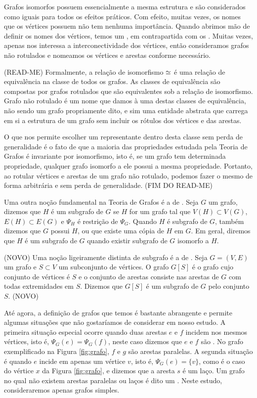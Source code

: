Grafos isomorfos possuem essencialmente a mesma estrutura e são considerados como iguais para todos os efeitos práticos. Com efeito, muitas vezes, os nomes que os vértices possuem não tem nenhuma importância. Quando abrimos mão de definir os nomes dos vértices, temos um , em contrapartida com os . Muitas vezes, apenas nos interessa a interconectividade dos vértices, então consideramos grafos não rotulados e nomeamos os vértices e arestas conforme necessário.

(READ-ME)
Formalmente, a relação de isomorfismo $\operatorname{\simeq}$ é uma relação de equivalência na classe de todos os grafos. As classes de equivalência são compostas por grafos rotulados que são equivalentes sob a relação de isomorfismo. Grafo não rotulado é um nome que damos à uma destas classes de equivalência, não sendo um grafo propriamente dito, e sim uma entidade abstrata que carrega em si a estrutura de um grafo sem incluir os rótulos dos vértices e das arestas.

O que nos permite escolher um representante dentro desta classe sem perda de generalidade é o fato de que a maioria das propriedades estudada pela Teoria de Grafos é invariante por isomorfismo, isto é, se um grafo tem determinada propriedade, qualquer grafo isomorfo a ele possui a mesma propriedade. Portanto, ao rotular vértices e arestas de um grafo não rotulado, podemos fazer o mesmo de forma arbitrária e sem perda de generalidade.
(FIM DO READ-ME)

Uma outra noção fundamental na Teoria de Grafos é a de . Seja $G$ um grafo, dizemos que $H$ é um subgrafo de $G$ se $H$ for um grafo tal que $V(H) \subset V(G)$, $E(H) \subset E(G)$ e $\Psi_H$ é restrição de $\Psi_G$. Quando $H$ é subgrafo de $G$, também dizemos que $G$ possui $H$, ou que existe uma cópia de $H$ em $G$. Em geral, diremos que $H$ é um subgrafo de $G$ quando existir subgrafo de $G$ isomorfo a $H$.

(NOVO)
Uma noção ligeiramente distinta de subgrafo é a de . Seja $G = (V,E)$ um grafo e $S \subset V$ um subconjunto de vértices. O grafo $G[S]$ é o grafo cujo conjunto de vértices é $S$ e o conjunto de arestas consiste nas arestas de $G$ com todas extremidades em $S$. Dizemos que $G[S]$ é um subgrafo de $G$  pelo conjunto $S$.
(NOVO)

Até agora, a definição de grafos que temos é bastante abrangente e permite algumas situações que não gostaríamos de considerar em nosso estudo. A primeira situação especial ocorre quando duas arestas $e$ e $f$ incidem nos mesmos vértices, isto é, $\Psi_G(e) = \Psi_G(f)$, neste caso dizemos que $e$ e $f$ são . No grafo exemplificado na Figura \ref{fig:grafo}, $f$ e $g$ são arestas paralelas. A segunda situação é quando $e$ incide em apenas um vértice $v$, isto é, $\Psi_G(e) = \{v\}$, como é o caso do vértice $x$ da Figura \ref{fig:grafo}, e dizemos que a aresta $s$ é um laço. Um grafo no qual não existem arestas paralelas ou laços é dito um . Neste estudo, consideraremos apenas grafos simples.


